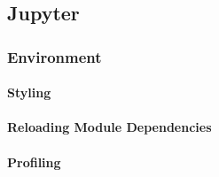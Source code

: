 \subsection{Jupyter}

\subsubsection{Environment}

\paragraph{Styling}


\paragraph{Reloading Module Dependencies}

\paragraph{Profiling}